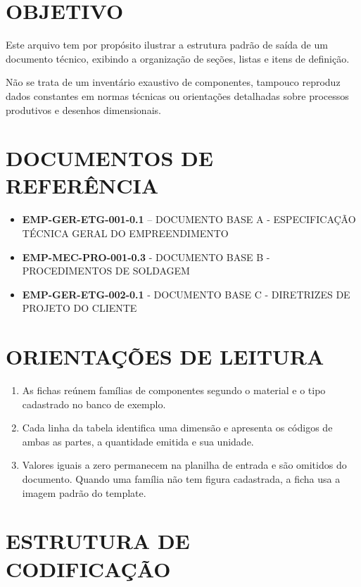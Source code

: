 \section{OBJETIVO}
Este arquivo tem por propósito ilustrar a estrutura padrão de saída de um documento técnico, exibindo a organização de seções, listas e itens de definição.

\noindent Não se trata de um inventário exaustivo de componentes, tampouco reproduz dados constantes em normas técnicas ou orientações detalhadas sobre processos produtivos e desenhos dimensionais.


\section{DOCUMENTOS DE REFERÊNCIA}
\begin{itemize}
\item \textbf{EMP-GER-ETG-001-0.1} – DOCUMENTO BASE A - ESPECIFICAÇÃO TÉCNICA GERAL DO EMPREENDIMENTO
\item \textbf{EMP-MEC-PRO-001-0.3} - DOCUMENTO BASE B - PROCEDIMENTOS DE SOLDAGEM
\item \textbf{EMP-GER-ETG-002-0.1} - DOCUMENTO BASE C - DIRETRIZES DE PROJETO DO CLIENTE
\end{itemize}

\section{ORIENTAÇÕES DE LEITURA}

\begin{enumerate}[label=\alph*)]
\item As fichas reúnem famílias de componentes segundo o material e o tipo cadastrado no banco de exemplo.

\item Cada linha da tabela identifica uma dimensão e apresenta os códigos de ambas as partes, a quantidade emitida e sua unidade.

\item Valores iguais a zero permanecem na planilha de entrada e são omitidos do documento. Quando uma família não tem figura cadastrada, a ficha usa a imagem padrão do template.
\end{enumerate}


\section{ESTRUTURA DE CODIFICAÇÃO}

